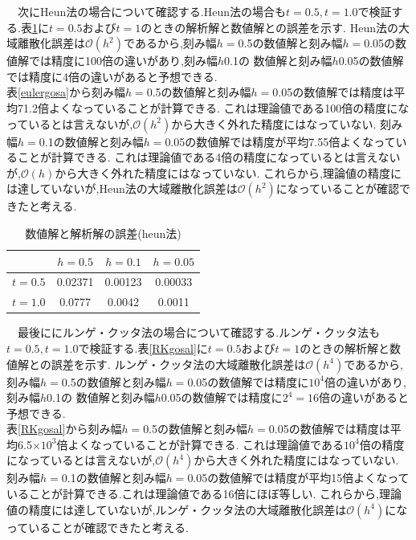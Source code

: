 \documentclass[dvipdfmx]{jarticle}
\begin{document}
  　次にHeun法の場合について確認する.Heun法の場合も$t=0.5,t=1.0$で検証する.表\ref{heungosa}に$t=0.5$および$t=1$のときの解析解と数値解との誤差を示す.
  Heun法の大域離散化誤差は$\mathcal{O}(h^2)$であるから,刻み幅$h=$0.5の数値解と刻み幅$h=$0.05の数値解では精度に100倍の違いがあり,刻み幅$h$0.1の
  数値解と刻み幅$h$0.05の数値解では精度に4倍の違いがあると予想できる.\\
  表\ref{eulergosa}から刻み幅$h=$0.5の数値解と刻み幅$h=$0.05の数値解では精度は平均71.2倍よくなっていることが計算できる.
  これは理論値である100倍の精度になっているとは言えないが,$\mathcal{O}(h^2)$から大きく外れた精度にはなっていない.
  刻み幅$h=$0.1の数値解と刻み幅$h=$0.05の数値解では精度が平均7.55倍よくなっていることが計算できる.
  これは理論値である4倍の精度になっているとは言えないが,$\mathcal{O}(h)$から大きく外れた精度にはなっていない.
  これらから,理論値の精度には達していないが,Heun法の大域離散化誤差は$\mathcal{O}(h^2)$になっていることが確認できたと考える.

  \begin{table}[H]
    \caption{数値解と解析解の誤差(heun法)}
  \label{heungosa}
  \begin{center}
      \begin{tabular}{c|c|c|c}\hline 
        & $h=0.5$ & $h=0.1$ & $h=0.05$ \\ \hline \hline 
        $t=0.5$ & 0.02371 & 0.00123 & 0.00033 \\ 
        $t=1.0$ & 0.0777 & 0.0042 & 0.0011 \\ \hline
      \end{tabular}
  \end{center}
  \end{table}    

  　最後ににルンゲ・クッタ法の場合について確認する.ルンゲ・クッタ法も$t=0.5,t=1.0$で検証する.表\ref{RKgosal}に$t=0.5$および$t=1$のときの解析解と数値解との誤差を示す.
  ルンゲ・クッタ法の大域離散化誤差は$\mathcal{O}(h^4)$であるから,刻み幅$h=$0.5の数値解と刻み幅$h=$0.05の数値解では精度に$10^4$倍の違いがあり,刻み幅$h$0.1の
  数値解と刻み幅$h$0.05の数値解では精度に$2^4=16$倍の違いがあると予想できる.\\
  表\ref{RKgosal}から刻み幅$h=$0.5の数値解と刻み幅$h=$0.05の数値解では精度は平均6.5$\times10^3$倍よくなっていることが計算できる.
  これは理論値である$10^4$倍の精度になっているとは言えないが,$\mathcal{O}(h^4)$から大きく外れた精度にはなっていない.
  刻み幅$h=$0.1の数値解と刻み幅$h=$0.05の数値解では精度が平均15倍よくなっていることが計算できる.これは理論値である16倍にほぼ等しい.
  これらから,理論値の精度には達していないが,ルンゲ・クッタ法の大域離散化誤差は$\mathcal{O}(h^4)$になっていることが確認できたと考える.
\end{document}
